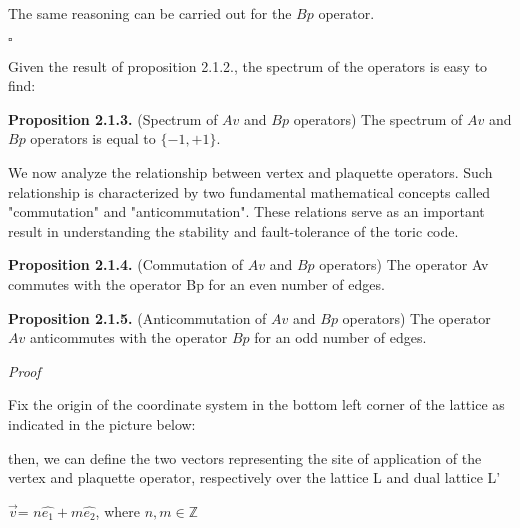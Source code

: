 \documentclass[12pt]{report}
\begin{document}
	\begin{minipage}{1\textwidth}
		
		The same reasoning can be carried out for the $Bp$ operator.
		
		\hfill $\square$ \newline
		
		Given the result of proposition 2.1.2., the spectrum of the operators is easy to find:	\newline
		
		\textbf{Proposition 2.1.3.} (Spectrum of $Av$ and $Bp$ operators) The spectrum of $Av$ and $Bp$ operators is equal to $ \{-1,+1\}$. \newline
		
		We now analyze the relationship between vertex and plaquette operators. Such relationship is characterized by two fundamental mathematical concepts called "commutation" and "anticommutation". These relations serve as an important result in understanding the stability and fault-tolerance of the toric code.	\newline
		
		\textbf{Proposition 2.1.4.} (Commutation of $Av$ and $Bp$ operators) The operator Av commutes with the operator Bp for an even number of edges.
		\newline
		
		\textbf{Proposition 2.1.5.} (Anticommutation of $Av$ and $Bp$ operators) The operator $Av$ anticommutes with the operator $Bp$ for an odd number of edges.
		\newline
		
		\textit{Proof}\newline 
		
		Fix the origin of the coordinate system in the bottom left corner of the lattice as indicated in the picture below:\newline
		
		
		then, we can define the two vectors representing the site of application of the vertex and plaquette operator, respectively over the lattice L and dual lattice L'
		
		\begin{center}
			$\vec{v}$= $n\hat{e_1} + m\hat{e_2}$, where $n,m \in \mathbb{Z}$ \newline
			

\end{center}
\end{minipage}
\end{document}
